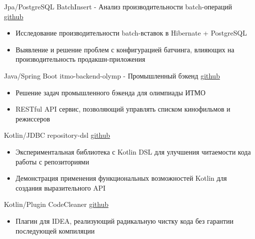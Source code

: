 \documentclass[9pt]{developercv} %
\begin{document}
\begin{entrylist}
     \entry
		{Jpa/PostgreSQL}
		{BatchInsert - Анализ производительности batch-операций}
		{\href{https://github.com/Kre4/BatchInsert}{github}}
		{\vspace{-10pt}
        \begin{itemize}[noitemsep,topsep=0pt,parsep=0pt,partopsep=0pt, leftmargin=-1pt]
            \item Исследование производительности batch-вставок в Hibernate + PostgreSQL
            \item Выявление и решение проблем с конфигурацией батчинга, влияющих на производительность продакшн-приложения
        \end{itemize}}

    \entry
		{Java/Spring Boot}
		{itmo-backend-olymp - Промышленный бэкенд}
		{\href{https://github.com/Kre4/itmo-backend-olymp}{github}}
		{\vspace{-10pt}
        \begin{itemize}[noitemsep,topsep=0pt,parsep=0pt,partopsep=0pt, leftmargin=-1pt]
            \item Решение задач промышленного бэкенда для олимпиады ИТМО
            \item RESTful API сервис, позволяющий управлять списком кинофильмов и режиссеров
        \end{itemize}}

    \entry
		{Kotlin/JDBC}
		{repository-dsl}
		{\href{https://github.com/Kre4/repository-dsl}{github}}
		{\vspace{-10pt}
        \begin{itemize}[noitemsep,topsep=0pt,parsep=0pt,partopsep=0pt, leftmargin=-1pt]
            \item Экспериментальная библиотека с Kotlin DSL для улучшения читаемости кода работы с репозиториями
            \item Демонстрация применения функциональных возможностей Kotlin для создания выразительного API
        \end{itemize}}
        
    \entry
		{Kotlin/Plugin}
		{CodeCleaner}
		{\href{https://github.com/Kre4/CodeCleaner}{github}}
		{\vspace{-10pt}
        \begin{itemize}[noitemsep,topsep=0pt,parsep=0pt,partopsep=0pt, leftmargin=-1pt]
            \item Плагин для IDEA, реализующий радикальную чистку кода без гарантии последующей компиляции
        \end{itemize}}
\end{entrylist}
\end{document}
